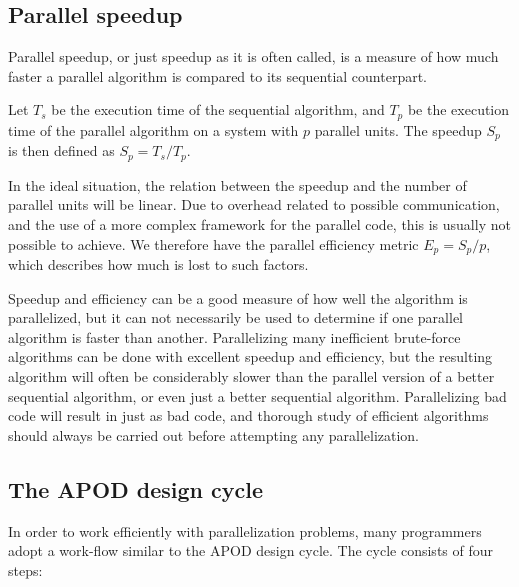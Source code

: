 \subsection{Parallel speedup} %
\label{sub:parallel_speedup}
Parallel speedup, or just speedup as it is often called, is a measure of how much faster a parallel algorithm is compared to its sequential counterpart.

Let $T_s$ be the execution time of the sequential algorithm, and $T_p$ be the execution time of the parallel algorithm on a system with $p$ parallel units. The speedup $S_p$ is then defined as $S_p = T_s / T_p$.

In the ideal situation, the relation between the speedup and the number of parallel units will be linear. Due to overhead related to possible communication, and the use of a more complex framework for the parallel code, this is usually not possible to achieve. We therefore have the parallel efficiency metric $E_p = S_p / p$, which describes how much is lost to such factors.

Speedup and efficiency can be a good measure of how well the algorithm is parallelized, but it can not necessarily be used to determine if one parallel algorithm is faster than another. Parallelizing many inefficient brute-force algorithms can be done with excellent speedup and efficiency, but the resulting algorithm will often be considerably slower than the parallel version of a better sequential algorithm, or even just a better sequential algorithm. Parallelizing bad code will result in just as bad code, and thorough study of efficient algorithms should always be carried out before attempting any parallelization.

\subsection{The APOD design cycle} %
\label{sub:the_apod_design_cycle}
In order to work efficiently with parallelization problems, many programmers adopt a work-flow similar to the APOD design cycle\citep[Assess, Parallelize, Optimize, Deploy]{cuda_c_best_practices_guide}. The cycle consists of four steps:

